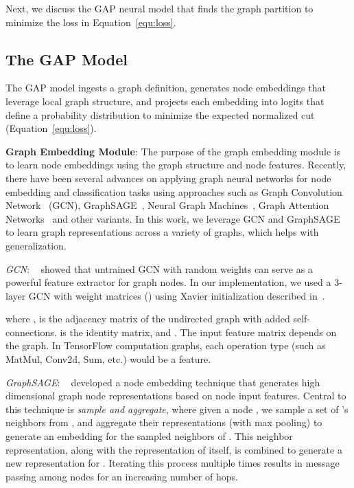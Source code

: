 \documentclass[10pt,twocolumn]{article}
\begin{document}
Next, we discuss the GAP neural model that finds the graph partition  to minimize the loss in Equation~\ref{equ:loss}.

\subsection{The GAP Model}
\label{sec:framework}

The GAP model ingests a graph definition, generates node embeddings that leverage local graph structure, and projects each embedding into logits that define a probability distribution to minimize the expected normalized cut (Equation~\ref{equ:loss}). 

\noindent\textbf{Graph Embedding Module}:
The purpose of the graph embedding module is to learn node embeddings using the graph structure and node features. Recently, there have been several advances on applying graph neural networks for node embedding and classification tasks using approaches such as Graph Convolution Network~\cite{kipf2017semi} (GCN), GraphSAGE~\cite{HamiltonYL17}, Neural Graph Machines~\cite{NGL17}, Graph Attention Networks~\cite{GAT2018} and other variants. In this work, we leverage GCN and GraphSAGE to learn graph representations across a variety of graphs, which helps with generalization. 

\noindent\emph{GCN}:
~\cite{kipf2017semi} showed that untrained GCN with random weights can serve as a powerful feature extractor for graph nodes. In our implementation, we used a 3-layer GCN with weight matrices () using Xavier initialization described in~\cite{Xavier_2010}.


where ,  is the adjacency matrix of the undirected graph  with added self-connections.  is the identity matrix, and . The input feature matrix  depends on the graph. In TensorFlow computation graphs, each operation type (such as MatMul, Conv2d, Sum, etc.) would be a feature.

\noindent\emph{GraphSAGE}:
~\cite{HamiltonYL17} developed a node embedding technique that generates high dimensional graph node representations based on node input features. Central to this technique is \emph{sample and aggregate}, where given a node , we sample a set of 's neighbors from , and aggregate their representations (with max pooling) to generate an embedding for the sampled neighbors of . This neighbor representation, along with the representation of  itself, is combined to generate a new representation for . Iterating this process multiple times results in message passing among nodes for an increasing number of hops. 
\end{document}
